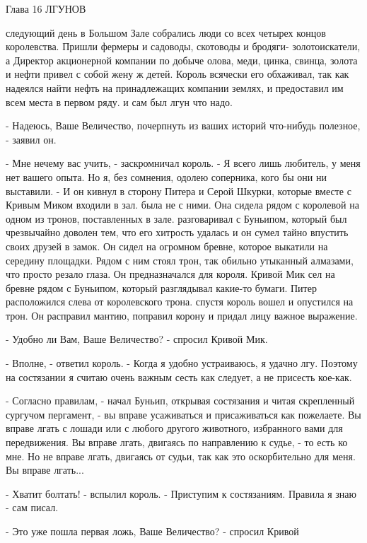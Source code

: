 Глава 16
 ЛГУНОВ
\par{} следующий день в Большом Зале собрались люди со всех четырех 
концов королевства. Пришли фермеры и садоводы, скотоводы и бродяги-
золотоискатели, а Директор акционерной компании по добыче олова, меди, 
цинка, свинца, золота и нефти привел с собой жену ж детей. Король 
всячески его обхаживал, так как надеялся найти нефть на принадлежащих 
компании землях, и предоставил им всем места в первом ряду.
 и сам был лгун что надо.
\par- Надеюсь, Ваше Величество, почерпнуть из ваших историй что-нибудь 
полезное, - заявил он.
\par- Мне нечему вас учить, - заскромничал король. - Я всего лишь 
любитель, у меня нет вашего опыта. Но я, без сомнения, одолею 
соперника, кого бы они ни выставили. - И он кивнул в сторону Питера и 
Серой Шкурки, которые вместе с Кривым Миком входили в зал.
 была не с ними. Она сидела рядом с королевой на одном из 
тронов, поставленных в зале.
 разговаривал с Буньипом, который был чрезвычайно доволен 
тем, что его хитрость удалась и он сумел тайно впустить своих друзей в 
замок. Он сидел на огромном бревне, которое выкатили на середину 
площадки. Рядом с ним стоял трон, так обильно утыканный алмазами, что 
просто резало глаза. Он предназначался для короля. Кривой Мик сел на 
бревне рядом с Буньипом, который разглядывал какие-то бумаги. Питер 
расположился слева от королевского трона.
 спустя король вошел и опустился на трон. Он расправил 
мантию, поправил корону и придал лицу важное выражение.
\par- Удобно ли Вам, Ваше Величество? - спросил Кривой Мик.
\par- Вполне, - ответил король. - Когда я удобно устраиваюсь, я удачно 
лгу. Поэтому на состязании я считаю очень важным сесть как следует, а 
не присесть кое-как.
\par- Согласно правилам, - начал Буньип, открывая состязания и читая 
скрепленный сургучом пергамент, - вы вправе усаживаться и 
присаживаться как пожелаете. Вы вправе лгать с лошади или с любого 
другого животного, избранного вами для передвижения. Вы вправе лгать, 
двигаясь по направлению к судье, - то есть ко мне. Но не вправе лгать, 
двигаясь от судьи, так как это оскорбительно для меня. Вы вправе 
лгать...
\par- Хватит болтать! - вспылил король. - Приступим к состязаниям. 
Правила я знаю - сам писал.
\par- Это уже пошла первая ложь, Ваше Величество? - спросил Кривой 
